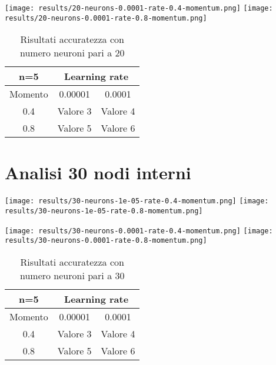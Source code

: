 \begin{center}
\texttt{[image: results/20-neurons-0.0001-rate-0.4-momentum.png]}
\texttt{[image: results/20-neurons-0.0001-rate-0.8-momentum.png]}
\end{center}
\begin{table}[htbp]
    \centering
    \begin{tabular}{|c|c|c|}
    \hline
    n=5 & \multicolumn{2}{c|}{Learning rate} \\
    \hline
    Momento & 0.00001 & 0.0001 \\
    \hline
    0.4 & Valore 3 & Valore 4 \\
    \hline
    0.8 & Valore 5 & Valore 6 \\
    \hline
    \end{tabular}
    \caption{Risultati accuratezza con numero neuroni pari a 20}
\end{table}

\section{Analisi 30 nodi interni}
\begin{center}
\texttt{[image: results/30-neurons-1e-05-rate-0.4-momentum.png]}
\texttt{[image: results/30-neurons-1e-05-rate-0.8-momentum.png]}
\end{center}

\begin{center}
\texttt{[image: results/30-neurons-0.0001-rate-0.4-momentum.png]}
\texttt{[image: results/30-neurons-0.0001-rate-0.8-momentum.png]}
\label{fig:n5-m0.8-l0.00001}
\end{center}
\begin{table}[htbp]
    \centering
    \begin{tabular}{|c|c|c|}
    \hline
    n=5 & \multicolumn{2}{c|}{Learning rate} \\
    \hline
    Momento & 0.00001 & 0.0001 \\
    \hline
    0.4 & Valore 3 & Valore 4 \\
    \hline
    0.8 & Valore 5 & Valore 6 \\
    \hline
    \end{tabular}
    \caption{Risultati accuratezza con numero neuroni pari a 30}
\end{table}


